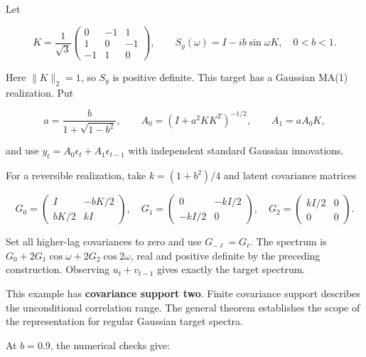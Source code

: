 \documentclass[11pt,a4paper]{article}
\begin{document}
Let

\[
K=\frac1{\sqrt3}\begin{pmatrix}0&-1&1\\1&0&-1\\-1&1&0\end{pmatrix},\qquad
S_y(\omega)=I-i b\sin\omega K,\quad 0<b<1.
\]

Here \(\|K\|_2=1\), so \(S_y\) is positive definite. This target has a Gaussian MA(1) realization. Put

\[
a=\frac{b}{1+\sqrt{1-b^2}},\qquad
A_0=(I+a^2KK^T)^{-1/2},\qquad A_1=aA_0K,
\]

and use \(y_t=A_0\epsilon_t+A_1\epsilon_{t-1}\) with independent standard Gaussian innovations.

For a reversible realization, take \(k=(1+b^2)/4\) and latent covariance matrices

\[
G_0=\begin{pmatrix}I&-bK/2\\bK/2&kI\end{pmatrix},\quad
G_1=\begin{pmatrix}0&-kI/2\\-kI/2&0\end{pmatrix},\quad
G_2=\begin{pmatrix}kI/2&0\\0&0\end{pmatrix}.
\]

Set all higher-lag covariances to zero and use \(G_{-\ell}=G_\ell\). The spectrum is \(G_0+2G_1\cos\omega+2G_2\cos2\omega\), real and positive definite by the preceding construction. Observing \(u_t+v_{t-1}\) gives exactly the target spectrum.

This example has \textbf{covariance support two}. Finite covariance support describes the unconditional correlation range. The general theorem establishes the scope of the representation for regular Gaussian target spectra.

At \(b=0.9\), the numerical checks give:
\end{document}
